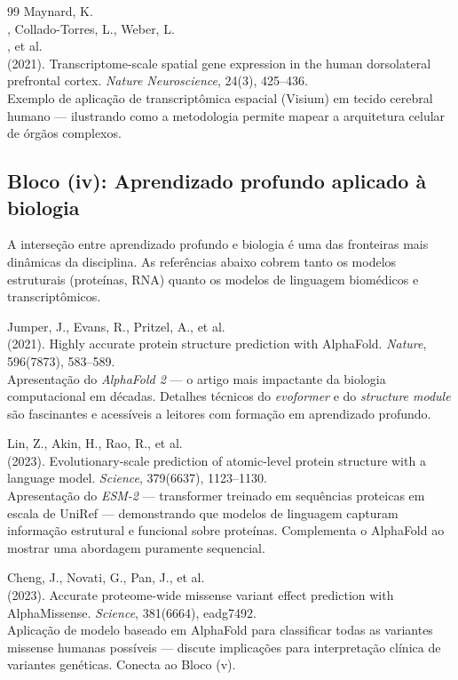 \begin{thebibliography}{99}
 Maynard, K.\\, Collado-Torres, L., Weber, L.\\, et al.\\ (2021). Transcriptome-scale spatial gene expression in the human dorsolateral prefrontal cortex. \emph{Nature Neuroscience}, 24(3), 425--436.\\ Exemplo de aplicação de transcriptômica espacial (Visium) em tecido cerebral humano --- ilustrando como a metodologia permite mapear a arquitetura celular de órgãos complexos.

\subsection*{Bloco (iv): Aprendizado profundo aplicado à biologia}

A interseção entre aprendizado profundo e biologia é uma das fronteiras mais dinâmicas da disciplina. As referências abaixo cobrem tanto os modelos estruturais (proteínas, RNA) quanto os modelos de linguagem biomédicos e transcriptômicos.

 Jumper, J., Evans, R., Pritzel, A., et al.\\ (2021). Highly accurate protein structure prediction with AlphaFold. \emph{Nature}, 596(7873), 583--589.\\ Apresentação do \emph{AlphaFold 2} --- o artigo mais impactante da biologia computacional em décadas. Detalhes técnicos do \emph{evoformer} e do \emph{structure module} são fascinantes e acessíveis a leitores com formação em aprendizado profundo.

 Lin, Z., Akin, H., Rao, R., et al.\\ (2023). Evolutionary-scale prediction of atomic-level protein structure with a language model. \emph{Science}, 379(6637), 1123--1130.\\ Apresentação do \emph{ESM-2} --- transformer treinado em sequências proteicas em escala de UniRef --- demonstrando que modelos de linguagem capturam informação estrutural e funcional sobre proteínas. Complementa o AlphaFold ao mostrar uma abordagem puramente sequencial.

 Cheng, J., Novati, G., Pan, J., et al.\\ (2023). Accurate proteome-wide missense variant effect prediction with AlphaMissense. \emph{Science}, 381(6664), eadg7492.\\ Aplicação de modelo baseado em AlphaFold para classificar todas as variantes missense humanas possíveis --- discute implicações para interpretação clínica de variantes genéticas. Conecta ao Bloco (v).


\end{thebibliography}
